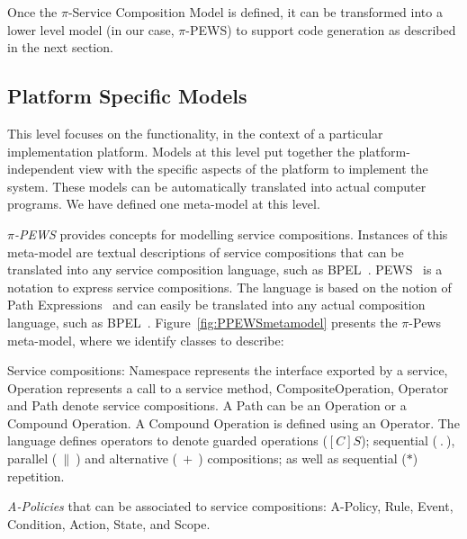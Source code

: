\documentclass{singlecol-new}
\theoremstyle{TH}{
\newtheorem{lemma}{Lemma}
\newtheorem{theorem}[lemma]{Theorem}
\newtheorem{corrolary}[lemma]{Corrolary}
\newtheorem{conjecture}[lemma]{Conjecture}
\newtheorem{proposition}[lemma]{Proposition}
\newtheorem{claim}[lemma]{Claim}
\newtheorem{stheorem}[lemma]{Wrong Theorem}
\newtheorem{algorithm}{Algorithm}
}
\theoremstyle{THrm}{
\newtheorem{definition}{Definition}[section]
\newtheorem{question}{Question}[section]
\newtheorem{remark}{Remark}
\newtheorem{scheme}{Scheme}
}
\theoremstyle{THhit}{
\newtheorem{case}{Case}[section]
}
\theoremstyle{THhsl}{
\newtheorem{example}{Example}
}
\begin{document}
Once the $\pi$-Service Composition Model is defined,  it can be transformed into a lower level model (in our case, $\pi$-PEWS) to support code generation as described in the next section.


\subsection{Platform Specific Models}

This level focuses on the functionality, in the context of a particular implementation platform.
Models at this level put together the platform-independent view with the specific aspects of the platform to implement the system.
These models  can be automatically translated into actual computer programs.
We have defined one meta-model at this level.

\textit{$\pi$-PEWS} provides con\-cepts for modelling service compositions.
Instances of this meta-model are textual descriptions of service compositions that can be translated into any service composition language, such as BPEL~\cite{bpel03}.%
%
PEWS~\cite{BHM06}%
 is a notation to express service compositions.
The language is based on the notion of Path Expressions~\cite{And79} and can easily be translated into any actual composition language, such as BPEL~\cite{bpel03}.
Figure~\ref{fig:PPEWSmetamodel} presents the $\pi$-{\sc Pews} meta-model, where we identify classes to describe:

\begin{compactitem}
\item Service compositions: {\sc Namespace} represents the interface exported by a service, {\sc Operation} represents a call to a service method, {\sc CompositeOperation}, {\sc Operator} and {\sc Path}  denote service compositions.
A {\sc Path} can be an {\sc Operation} or a {\sc Compound Operation}.
A {\sc Compound Operation} is defined using an {\sc Operator}.
The language defines operators to denote guarded operations ($[C]S$); sequential ($\ . \ $), parallel ($\ \| \ $) and alternative ($\ + \ $) compositions; as well as sequential ($*$) repetition.
\item {\em A-Policies} that can be associated to service compositions:  {\sc A-Policy}, {\sc Rule}, {\sc Event}, {\sc Condition}, {\sc Action}, {\sc State}, and {\sc Scope}.
\end{compactitem}
\end{document}
